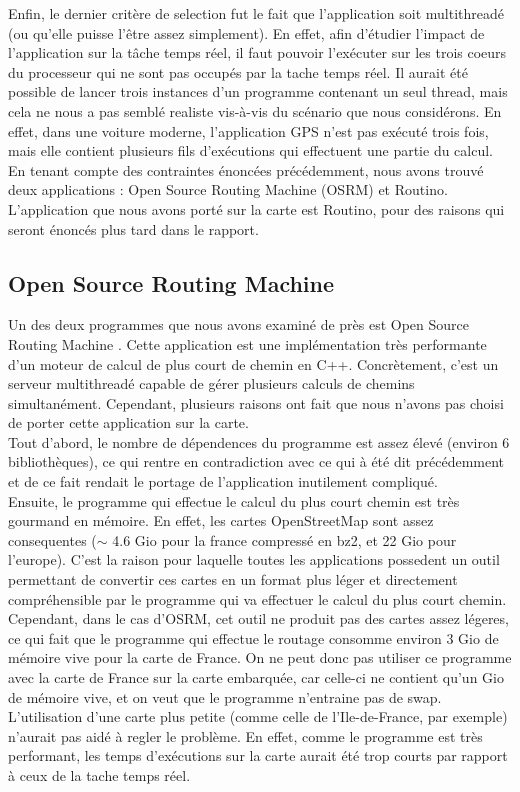Enfin, le dernier critère de selection fut le fait que l'application soit 
multithreadé (ou qu'elle puisse l'être assez simplement). En effet, afin 
d'étudier l'impact de l'application sur la tâche temps réel, il faut pouvoir 
l'exécuter sur les trois coeurs du processeur qui ne sont pas occupés par la
tache temps réel. Il aurait été possible de lancer trois instances d'un 
programme contenant un seul thread, mais cela ne nous a pas semblé realiste 
vis-à-vis du scénario que nous considérons. En effet, dans une voiture moderne, 
l'application GPS n'est pas exécuté trois fois, mais elle contient plusieurs 
fils d'exécutions qui effectuent une partie du calcul. \\

En tenant compte des contraintes énoncées précédemment, nous avons trouvé deux
applications : Open Source Routing Machine (OSRM) et Routino. L'application que
nous avons porté sur la carte est Routino, pour des raisons qui seront énoncés
plus tard dans le rapport.

\subsection{Open Source Routing Machine}

Un des deux programmes que nous avons examiné de près est Open Source Routing 
Machine \cite{_open_????}. Cette application est une implémentation 
très performante d'un moteur de calcul de plus court de chemin en C++. 
Concrètement, c'est un serveur multithreadé capable de gérer plusieurs calculs 
de chemins simultanément. Cependant, plusieurs raisons ont fait que nous 
n'avons pas choisi de porter cette application sur la carte. \\

Tout d'abord, le nombre de dépendences du programme est assez élevé (environ 
6 bibliothèques), ce qui rentre en contradiction avec ce qui à été dit 
précédemment et de ce fait rendait le portage de l'application inutilement
compliqué. \\

Ensuite, le programme qui effectue le calcul du plus court chemin est très 
gourmand en mémoire. En effet, les cartes OpenStreetMap sont assez consequentes 
($\sim$ 4.6 Gio pour la france compressé en bz2, et 22 Gio pour l'europe). C'est
 la raison pour laquelle toutes les applications possedent un outil permettant 
de convertir ces cartes en un format plus léger et directement compréhensible 
par le programme qui va effectuer le calcul du plus court chemin. Cependant, 
dans le cas d'OSRM, cet outil ne produit pas des cartes assez légeres, ce qui 
fait que le programme qui effectue le routage consomme environ 3 Gio de mémoire 
vive pour la carte de France. On ne peut donc pas utiliser ce programme avec la 
carte de France sur la carte embarquée, car celle-ci ne contient qu'un Gio de 
mémoire vive, et on veut que le programme n'entraine pas de swap. L'utilisation 
d'une carte plus petite (comme celle de l'Ile-de-France, par exemple) n'aurait 
pas aidé à regler le problème. En effet, comme le programme est très performant,
les temps d'exécutions sur la carte aurait été trop courts par rapport à ceux 
de la tache temps réel. \\

